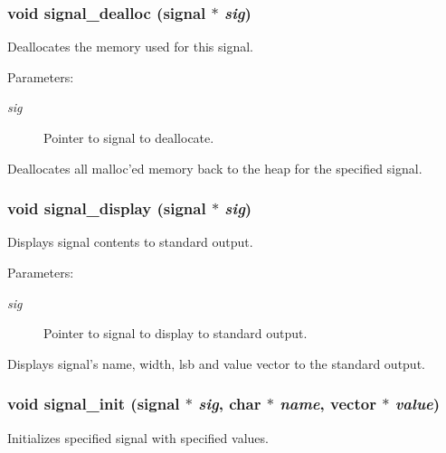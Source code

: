 \subsubsection{\setlength{\rightskip}{0pt plus 5cm}void signal\_\-dealloc ({\bf signal} $\ast$ {\em sig})}\label{signal_8c_a8}


Deallocates the memory used for this signal.

\begin{Desc}
\item[Parameters: ]\par
\begin{description}
\item[{\em 
sig}]Pointer to signal to deallocate.\end{description}
\end{Desc}
Deallocates all malloc'ed memory back to the heap for the specified signal. 
\subsubsection{\setlength{\rightskip}{0pt plus 5cm}void signal\_\-display ({\bf signal} $\ast$ {\em sig})}\label{signal_8c_a7}


Displays signal contents to standard output.

\begin{Desc}
\item[Parameters: ]\par
\begin{description}
\item[{\em 
sig}]Pointer to signal to display to standard output.\end{description}
\end{Desc}
Displays signal's name, width, lsb and value vector to the standard output. 
\subsubsection{\setlength{\rightskip}{0pt plus 5cm}void signal\_\-init ({\bf signal} $\ast$ {\em sig}, char $\ast$ {\em name}, {\bf vector} $\ast$ {\em value})}\label{signal_8c_a0}


Initializes specified signal with specified values.

